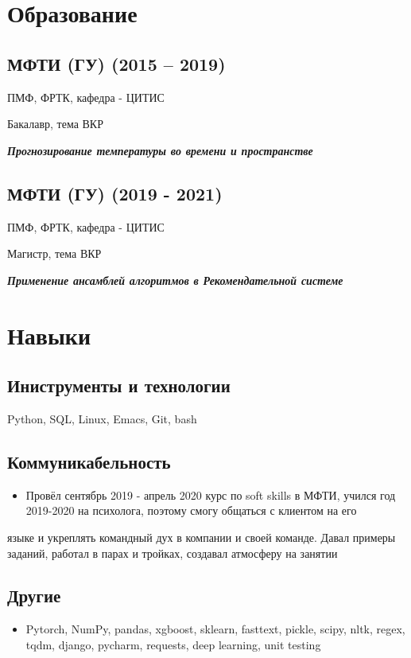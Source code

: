 \documentclass[11pt]{article}
\begin{document}
\section{Образование}
\label{sec:orgff917c3}
\subsection{МФТИ (ГУ) (2015 – 2019)}
\label{sec:orga7848e0}
ПМФ, ФРТК, кафедра - ЦИТИС

Бакалавр, тема ВКР

\begin{center}
\textbf{\emph{Прогнозирование температуры во времени и пространстве}}
\end{center}
\subsection{МФТИ (ГУ) (2019 - 2021)}
\label{sec:orgc84d405}
ПМФ, ФРТК, кафедра - ЦИТИС

Магистр, тема ВКР
\begin{center}
\textbf{\emph{Применение ансамблей алгоритмов в Рекомендательной системе}}
\end{center}

\section{Навыки}
\label{sec:orgc5e2a61}
\subsection{Иниструменты и технологии}
\label{sec:org1127baa}
Python, SQL, Linux, Emacs, Git, bash
\subsection{Коммуникабельность}
\label{sec:org64ca972}
\begin{itemize}
\item Провёл сентябрь 2019 - апрель 2020 курс по soft skills в МФТИ, учился год 2019-2020 на психолога, поэтому смогу общаться с клиентом на его
\end{itemize}
языке и укреплять командный дух в компании и своей команде. Давал примеры заданий, работал в парах и тройках, создавал атмосферу на занятии
\subsection{Другие}
\label{sec:orgb672df2}
\begin{itemize}
\item Pytorch, NumPy, pandas, xgboost, sklearn, fasttext, pickle, scipy, nltk, regex, tqdm, django, pycharm, requests, deep learning, unit testing
\end{itemize}
\end{document}
